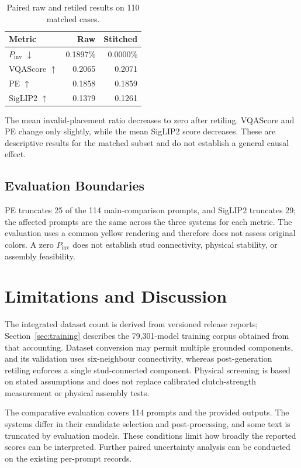 \documentclass[10pt,twocolumn,letterpaper]{article}
\begin{document}
\begin{table}[t]\centering\small\begin{tabular}{lrr}\toprule
Metric & Raw & Stitched \\ \midrule
$P_{\mathrm{inv}}$ $\downarrow$ & 0.1897\% & 0.0000\% \\
VQAScore $\uparrow$ & 0.2065 & 0.2071 \\
PE $\uparrow$ & 0.1858 & 0.1859 \\
SigLIP2 $\uparrow$ & 0.1379 & 0.1261 \\
\bottomrule\end{tabular}\caption{Paired raw and retiled results on 110 matched cases.}\end{table}
The mean invalid-placement ratio decreases to zero after retiling. VQAScore and PE change only slightly, while the mean SigLIP2 score decreases. These are descriptive results for the matched subset and do not establish a general causal effect.

\subsection{Evaluation Boundaries}
PE truncates 25 of the 114 main-comparison prompts, and SigLIP2 truncates 29; the affected prompts are the same across the three systems for each metric. The evaluation uses a common yellow rendering and therefore does not assess original colors. A zero $P_{\mathrm{inv}}$ does not establish stud connectivity, physical stability, or assembly feasibility.

\section{Limitations and Discussion}
The integrated dataset count is derived from versioned release reports; Section~\ref{sec:training} describes the 79,301-model training corpus obtained from that accounting. Dataset conversion may permit multiple grounded components, and its validation uses six-neighbour connectivity, whereas post-generation retiling enforces a single stud-connected component. Physical screening is based on stated assumptions and does not replace calibrated clutch-strength measurement or physical assembly tests.

The comparative evaluation covers 114 prompts and the provided outputs. The systems differ in their candidate selection and post-processing, and some text is truncated by evaluation models. These conditions limit how broadly the reported scores can be interpreted. Further paired uncertainty analysis can be conducted on the existing per-prompt records.
\end{document}
